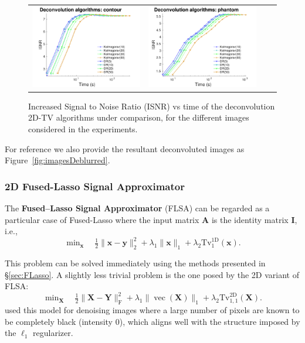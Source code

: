 \documentclass[twoside,11pt]{article}
\newcommand{\vx}{\bm{x}}       \newcommand{\vxh}{\hat{\bm{x}}}        \newcommand{\xh}{\hat{x}}    \newcommand{\vxt}{\tilde{\bm{x}}}       \newcommand{\xt}{\tilde{x}}
\newcommand{\vy}{\bm{y}}       \newcommand{\vyh}{\hat{\bm{y}}}        \newcommand{\yh}{\hat{y}}    \newcommand{\vyt}{\tilde{\bm{y}}}       \newcommand{\yt}{\tilde{y}}
\newcommand{\ma}{\bm{A}}
\newcommand{\mi}{\bm{I}}
\newcommand{\mx}{\bm{X}}
\newcommand{\my}{\bm{Y}}
\newcommand{\mynorm}[2]{\| {#1} \|_{#2}}
\newcommand{\norm}[2]{\mynorm{#1}{#2}}
\newcommand{\enorm}[1]{\mynorm{#1}{2}}
\newcommand{\frob}[1]{\|{#1}\|_{\text{F}}}
\DeclareMathOperator{\vect}{vec}
\newcommand{\nlmin}{\min\nolimits}
\newcommand{\half}{\tfrac{1}{2}}
\newcommand{\tvell}{\text{Tv}}
\newcommand{\oned}{\text{1D}}
\newcommand{\twod}{\text{2D}}
\numberwithin{equation}{section}
\numberwithin{theorem}{section}
\begin{document}
\begin{figure}[!htbp]
\begin{tabular}{llll}
  \includegraphics[width=.37\linewidth]{BMdeconvolution-ISNR-contour}&\hskip-12pt
  \includegraphics[width=.37\linewidth]{BMdeconvolution-ISNR-phantom}\\
  \end{tabular}
  \caption{Increased Signal to Noise Ratio (ISNR) vs time of the deconvolution 2D-TV algorithms under comparison, for the different images considered in the experiments.}
  \label{fig:2DTVdeconv-ISNR}
\end{figure}

For reference we also provide the resultant deconvoluted images as Figure~\ref{fig:imagesDeblurred}.

\subsubsection{2D Fused-Lasso Signal Approximator}
\label{sec:TV2FLSA}

The {\bf Fused--Lasso Signal Approximator} (FLSA)  \citep{frHaHoTi07} can be regarded as a particular case of Fused-Lasso where the input matrix $\ma$ is the identity matrix $\mi$, i.e.,
\begin{equation*}
   \nlmin_{\vx} \quad \half \enorm{\vx - \vy}^2 + \lambda_1 \norm{\vx}{1} + \lambda_2 \tvell_1^{\oned}(\vx).
\end{equation*}

This problem can be solved immediately using the methods presented in \S\ref{sec:FLasso}. A slightly less trivial problem is the one posed by the 2D variant of FLSA:
\begin{equation}
  \label{eq:29}
 \nlmin_{\mx} \quad \half\frob{\mx - \my}^2 + \lambda_1 \norm{\vect(\mx)}{1} + \lambda_2 \tvell_{1,1}^{\twod}(\mx).
\end{equation}
\citet{frHaHoTi07} used this model for denoising images where a large number of pixels are known to be completely black (intensity $0$), which aligns well with the structure imposed by the $\ell_1$ regularizer.
\end{document}
